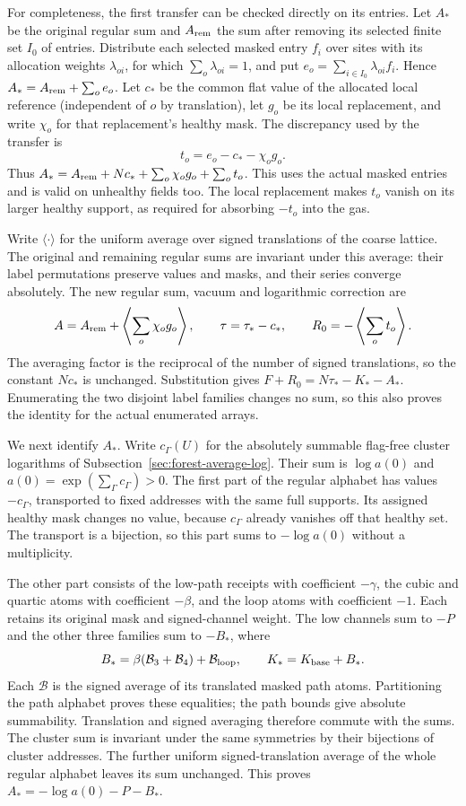 For completeness, the first transfer can be checked directly on its
entries. Let $A_*$ be the original regular sum and $A_{\rm rem}$
the sum after removing its selected finite set $I_0$ of entries.
Distribute each selected masked entry $f_i$ over sites with its
allocation weights $\lambda_{oi}$, for which $\sum_o\lambda_{oi}=1$,
and put $e_o=\sum_{i\in I_0}\lambda_{oi}f_i$. Hence
$A_*=A_{\rm rem}+\sum_o e_o$. Let $c_*$ be the common flat value
of the allocated local reference (independent of $o$ by translation),
let $g_o$ be its local replacement, and write $\chi_o$ for that
replacement's healthy mask. The discrepancy used by the transfer is
\[
 t_o=e_o-c_*-\chi_o g_o.
\]
Thus $A_*=A_{\rm rem}+Nc_*+\sum_o\chi_o g_o+\sum_o t_o$.
This uses the actual masked entries and is valid on unhealthy fields
too. The local replacement makes $t_o$ vanish on its larger healthy
support, as required for absorbing $-t_o$ into the gas.

Write $\langle\cdot\rangle$ for the uniform average over signed
translations of the coarse lattice. The original and remaining
regular sums are invariant under this average: their label
permutations preserve values and masks, and their series converge
absolutely. The new regular sum, vacuum and logarithmic correction are
\[
 A=A_{\rm rem}+\left\langle\sum_o\chi_o g_o\right\rangle,
 \qquad \tau=\tau_*-c_*,
 \qquad R_0=-\left\langle\sum_o t_o\right\rangle.
\]
The averaging factor is the reciprocal of the number of signed
translations, so the constant $Nc_*$ is unchanged. Substitution gives
$F+R_0=N\tau_*-K_*-A_*$. Enumerating the two disjoint label
families changes no sum, so this also proves the identity for the
actual enumerated arrays.

We next identify $A_*$. Write $c_\Gamma(U)$ for the absolutely
summable flag-free cluster logarithms of
Subsection~\ref{sec:forest-average-log}. Their sum is $\log a(0)$
and $a(0)=\exp(\sum_\Gamma c_\Gamma)>0$.
The first part of the regular alphabet has values $-c_\Gamma$,
transported to fixed addresses with the same full supports.
Its assigned healthy mask changes no value, because $c_\Gamma$
already vanishes off that healthy set. The transport is a bijection,
so this part sums to $-\log a(0)$ without a multiplicity.

The other part consists of the low-path receipts with coefficient
$-\gamma$, the cubic and quartic atoms with coefficient $-\beta$,
and the loop atoms with coefficient $-1$. Each retains its original
mask and signed-channel weight. The low channels sum to $-P$ and
the other three families sum to $-B_*$, where
\[
 B_*=\beta(\mathcal B_3+\mathcal B_4)+\mathcal B_{\rm loop},
 \qquad K_*=K_{\rm base}+B_*.
\]
Each $\mathcal B$ is the signed average of its translated masked
path atoms. Partitioning the path alphabet proves these equalities;
the path bounds give absolute summability. Translation and signed
averaging therefore commute with the sums. The cluster sum is
invariant under the same symmetries by their bijections of cluster
addresses. The further uniform signed-translation average of the
whole regular alphabet leaves its sum unchanged. This proves
$A_*=-\log a(0)-P-B_*$.

